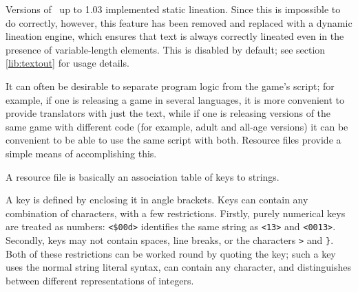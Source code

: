     Versions of \package\ up to 1.03 implemented static lineation.  Since this
    is impossible to do correctly, however, this feature has been removed and
    replaced with a dynamic lineation engine, which ensures that text is always
    correctly lineated even in the presence of variable-length elements.  This
    is disabled by default; see section \ref{lib:textout} for usage details.

\label{sec:resources}

  It can often be desirable to separate program logic from the game's script;
  for example, if one is releasing a game in several languages, it is more
  convenient to provide translators with just the text, while if one is
  releasing versions of the same game with different code (for example, adult
  and all-age versions) it can be convenient to be able to use the same script
  with both.  Resource files provide a simple means of accomplishing this.


    A resource file is basically an association table of keys to strings.

    A key is defined by enclosing it in angle brackets.  Keys can contain any
    combination of characters, with a few restrictions.  Firstly, purely
    numerical keys are treated as numbers: \lstinline|<$00d>| identifies the
    same string as \lstinline|<13>| and \lstinline|<0013>|.  Secondly, keys may
    not contain spaces, line breaks, or the characters \lstinline|>| and
    \lstinline|}|.  Both of these restrictions can be worked round by quoting
    the key; such a key uses the normal string literal syntax, can contain any
    character, and distinguishes between different representations of integers.

